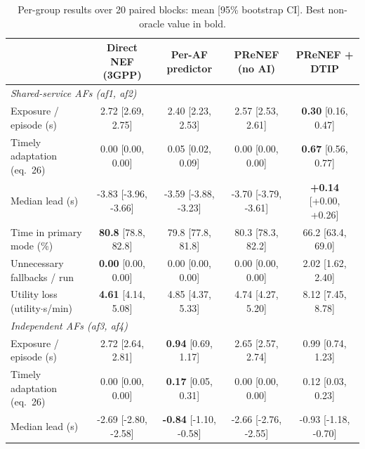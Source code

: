 \begin{table}[t]
\centering
\small
\caption{Per-group results over 20 paired blocks: mean [95\% bootstrap CI]. Best non-oracle value in bold.}
\label{tab:main}
\setlength{\tabcolsep}{4pt}
\begin{tabular}{lcccc}
\toprule
 & Direct NEF (3GPP) & Per-AF predictor & PReNEF (no AI) & PReNEF + DTIP \\
\midrule
\multicolumn{5}{l}{\textit{Shared-service AFs (af1, af2)}} \\
\quad Exposure / episode (s) & 2.72 {\scriptsize[2.69, 2.75]} & 2.40 {\scriptsize[2.23, 2.53]} & 2.57 {\scriptsize[2.53, 2.61]} & \textbf{0.30} {\scriptsize[0.16, 0.47]} \\
\quad Timely adaptation (eq.~26) & 0.00 {\scriptsize[0.00, 0.00]} & 0.05 {\scriptsize[0.02, 0.09]} & 0.00 {\scriptsize[0.00, 0.00]} & \textbf{0.67} {\scriptsize[0.56, 0.77]} \\
\quad Median lead (s) & -3.83 {\scriptsize[-3.96, -3.66]} & -3.59 {\scriptsize[-3.88, -3.23]} & -3.70 {\scriptsize[-3.79, -3.61]} & \textbf{+0.14} {\scriptsize[+0.00, +0.26]} \\
\quad Time in primary mode (\%) & \textbf{80.8} {\scriptsize[78.8, 82.8]} & 79.8 {\scriptsize[77.8, 81.8]} & 80.3 {\scriptsize[78.3, 82.2]} & 66.2 {\scriptsize[63.4, 69.0]} \\
\quad Unnecessary fallbacks / run & \textbf{0.00} {\scriptsize[0.00, 0.00]} & 0.00 {\scriptsize[0.00, 0.00]} & 0.00 {\scriptsize[0.00, 0.00]} & 2.02 {\scriptsize[1.62, 2.40]} \\
\quad Utility loss (utility$\cdot$s/min) & \textbf{4.61} {\scriptsize[4.14, 5.08]} & 4.85 {\scriptsize[4.37, 5.33]} & 4.74 {\scriptsize[4.27, 5.20]} & 8.12 {\scriptsize[7.45, 8.78]} \\
\midrule
\multicolumn{5}{l}{\textit{Independent AFs (af3, af4)}} \\
\quad Exposure / episode (s) & 2.72 {\scriptsize[2.64, 2.81]} & \textbf{0.94} {\scriptsize[0.69, 1.17]} & 2.65 {\scriptsize[2.57, 2.74]} & 0.99 {\scriptsize[0.74, 1.23]} \\
\quad Timely adaptation (eq.~26) & 0.00 {\scriptsize[0.00, 0.00]} & \textbf{0.17} {\scriptsize[0.05, 0.31]} & 0.00 {\scriptsize[0.00, 0.00]} & 0.12 {\scriptsize[0.03, 0.23]} \\
\quad Median lead (s) & -2.69 {\scriptsize[-2.80, -2.58]} & \textbf{-0.84} {\scriptsize[-1.10, -0.58]} & -2.66 {\scriptsize[-2.76, -2.55]} & -0.93 {\scriptsize[-1.18, -0.70]} \\

\end{tabular}
\end{table}
